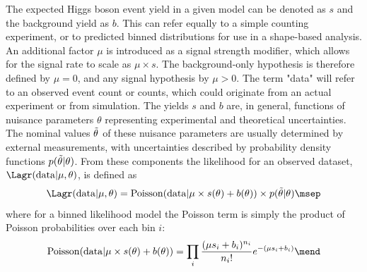 The expected Higgs boson event yield in a given model can be denoted as $s$ and the background yield as $b$. This can refer equally to a simple counting experiment, or to predicted binned distributions for use in a shape-based analysis. An additional factor $\mu$ is introduced as a signal strength modifier, which allows for the signal rate to scale as $\mu \times s$. The background-only hypothesis is therefore defined by $\mu = 0$, and any signal hypothesis by $\mu > 0$. The term "data" will refer to an observed event count or counts, which could originate from an actual experiment or from simulation. The yields $s$ and $b$ are, in general, functions of nuisance parameters $\theta$ representing experimental and theoretical uncertainties. The nominal values $\Tilde{\theta}$ of these nuisance parameters are usually determined by external measurements, with uncertainties described by probability density functions $p(\Tilde{\theta} | \theta)$. From these components the likelihood for an observed dataset, $\Lagr(\mathrm{data}|\mu,\theta)$, is defined as
\begin{equation}
    \Lagr(\mathrm{data}|\mu,\theta) = \mathrm{Poisson}(\mathrm{data}|\mu\times s(\theta) + b(\theta)) \times p(\Tilde{\theta}|\theta) \msep
\end{equation}
where for a binned likelihood model the Poisson term is simply the product of Poisson probabilities over each bin $i$:
\begin{equation}
    \mathrm{Poisson}(\mathrm{data}|\mu\times s(\theta) + b(\theta)) = \prod_{i} \frac{(\mu s_i + b_i)^{n_i}}{n_i !} e^{-(\mu s_i +b_i)} \mend
\end{equation}

